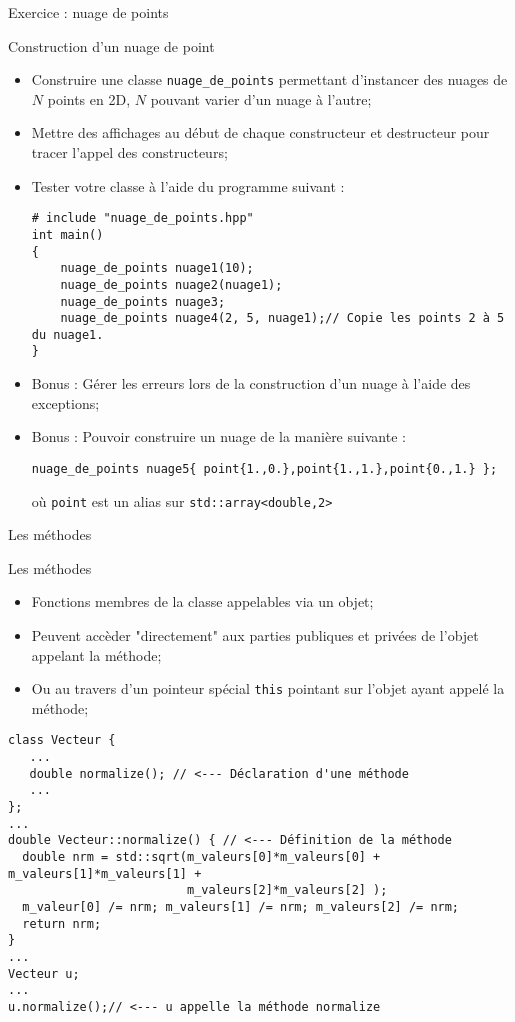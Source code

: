 \documentclass[handout,10pt]{beamer}
\begin{document}
\begin{frame}[fragile]{Exercice : nuage de points}
\tiny
\begin{exampleblock}{Construction d'un nuage de point}
\begin{itemize}
\item Construire une classe \lstinline$nuage_de_points$ permettant d'instancer des nuages de $N$ points en 2D, $N$ pouvant varier d'un nuage à l'autre;
\item Mettre des affichages au début de chaque constructeur et destructeur pour tracer l'appel des constructeurs;
\item Tester votre classe à l'aide du programme suivant :
\begin{lstlisting}
# include "nuage_de_points.hpp"
int main()
{
    nuage_de_points nuage1(10);
    nuage_de_points nuage2(nuage1);
    nuage_de_points nuage3;
    nuage_de_points nuage4(2, 5, nuage1);// Copie les points 2 à 5 du nuage1.
}
\end{lstlisting}
\item Bonus : Gérer les erreurs lors de la construction d'un nuage à l'aide des exceptions;
\item Bonus : Pouvoir construire un nuage de la manière suivante :
\begin{lstlisting}
nuage_de_points nuage5{ point{1.,0.},point{1.,1.},point{0.,1.} };
\end{lstlisting}
où \lstinline$point$ est un alias sur \lstinline$std::array<double,2>$
\end{itemize}
\end{exampleblock}
\end{frame}

\begin{frame}[fragile]{Les méthodes}
\tiny
\begin{block}{Les méthodes}
\begin{itemize}
\item Fonctions membres de la classe appelables via un objet;
\item Peuvent accèder "directement" aux parties publiques et privées de l'objet appelant la méthode;
\item Ou au travers d'un pointeur spécial \lstinline{this} pointant sur l'objet ayant appelé la méthode;
\end{itemize}
\end{block}

\begin{lstlisting}
class Vecteur {
   ...
   double normalize(); // <--- Déclaration d'une méthode
   ...
};
...
double Vecteur::normalize() { // <--- Définition de la méthode
  double nrm = std::sqrt(m_valeurs[0]*m_valeurs[0] + m_valeurs[1]*m_valeurs[1] +
                         m_valeurs[2]*m_valeurs[2] );
  m_valeur[0] /= nrm; m_valeurs[1] /= nrm; m_valeurs[2] /= nrm;
  return nrm;
}    
...
Vecteur u;
...
u.normalize();// <--- u appelle la méthode normalize
\end{lstlisting}
\end{frame}
\end{document}

